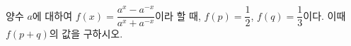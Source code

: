 양수 $a$에 대하여 $f(x)=\dfrac{a^{x}-a^{-x}}{a^{x}+a^{-x}}$이라 할 때, $f(p)=\dfrac{1}{2}$, $f(q)=\dfrac{1}{3}$이다. 이때 $f(p+q)$의 값을 구하시오.
